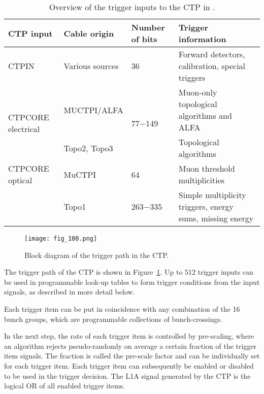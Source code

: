 \documentclass[cernpreprint, atlasdraft=false, UKenglish,british,orcidlogo, texmf, orcidlogo]{atlasdoc}
\begin{document}
\begin{table}[htbp]
\caption{\label{tab:ctp-inputs} Overview of the trigger inputs to the \gls{CTP} in \RunThr.}
\begin{center}
\begin{tabular}{|p{}|p{}|p{}|p{}|}
\hline
\textbf{\gls{CTP} input} & \textbf{Cable origin} & \textbf{Number of bits} & \textbf{Trigger information} \\
\hline
\gls{CTPIN}  & Various sources & 36 & Forward detectors, calibration, special triggers\\
\hline
\multirow{2}{0.15\textwidth}{CTPCORE electrical} & MUCTPI/ALFA & \multirow{2}{0.15\textwidth}{77$-$149} & Muon-only topological algorithms and ALFA\\ \cline{2-2}\cline{4-4}
& Topo2, Topo3& & Topological algorithms \\
\hline
CTPCORE optical & \gls{MuCTPI} & 64 & Muon threshold multiplicities \\ \cline{2-4}
& Topo1 & 263$-$335 & Simple multiplicity triggers, energy sums, missing energy\\
\hline
\end{tabular}
\end{center}
\end{table}
 
\begin{figure}[htbp!]
\centerline{\texttt{[image: fig\_100.png]}}
\caption{Block diagram of the trigger path in the CTP.}
\label{fig:TDAQ_CTPTriggerPath}
\end{figure}
 
The trigger path of the \gls{CTP} is shown in Figure~\ref{fig:TDAQ_CTPTriggerPath}.  Up to 512 trigger inputs can be used in programmable look-up tables to form trigger conditions from the input signals, as described in more detail below.  
 
Each trigger item can be put in coincidence with any combination of the 16 bunch groups, which are programmable collections of bunch-crossings.
 
In the next step, the rate of each trigger item is controlled by pre-scaling, where an algorithm rejects pseudo-randomly on average a certain fraction of the trigger item signals.  The fraction is called the pre-scale factor and can be individually set for each trigger item.  Each trigger item can subsequently be enabled or disabled to be used in the trigger decision.  The \gls{L1A} signal generated by the \gls{CTP} is the logical OR of all enabled trigger items.
 
\end{document}
